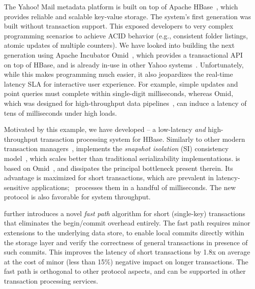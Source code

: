 The Yahoo! Mail metadata platform is built on top of Apache HBase~\cite{hbase}, 
which provides reliable and scalable key-value storage. The system's first generation
was built without transaction support. This exposed  developers to very complex programming scenarios 
to achieve ACID behavior (e.g., consistent folder listings, atomic updates of multiple counters). 
We have looked into building the next generation using 
 Apache Incubator Omid~\cite{omid}, which provides a transactional API on top of HBase, and 
 is already in-use in other Yahoo systems~\cite{Omid2017}.
Unfortunately, while this makes programming much easier, it also jeopardizes 
the real-time latency SLA for interactive user experience. For example,  
simple updates and point queries must complete within single-digit milliseconds, 
whereas Omid, which was designed for high-throughput data pipelines~\cite{Omid2017}, 
can induce a latency of tens of milliseconds under high loads. 

Motivated by this example, we have developed {\sys\/} -- a low-latency {\em and\/} high-throughput 
transaction processing system for HBase. Similarly to other modern transaction 
managers~\cite{Percolator2010,Spanner2012,Omid2017,cockroach},
{\sys\/} implements the {\em snapshot isolation} (SI) consistency model~\cite{DBLP:conf/sigmod/BerensonBGMOO95},
which scales better than traditional serializability implementations. {\sys\/} is based on Omid~\cite{omid}, 
and dissipates the principal bottleneck present therein.
Its advantage is maximized for short  transactions, which are prevalent in latency-sensitive applications;
\sys\ processes them in a handful of milliseconds. The new protocol is also favorable for system throughput. 

{\sys\/} further introduces a novel {\em fast path\/} algorithm for short (single-key) transactions 
that eliminates the begin/commit overhead entirely. The fast path requires minor extensions to the underlying 
data store, to enable local commits directly within the storage layer and verify the correctness of general 
transactions in presence of such commits. This improves the latency of short transactions 
by 1.8x on average at the cost of minor (less than 15\%) negative impact on longer transactions. 
The fast path is orthogonal to other protocol aspects, and can be  supported in other 
transaction processing services.

